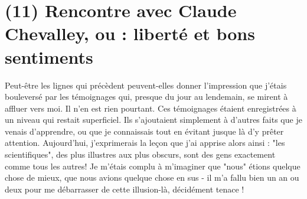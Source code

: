 \section{(11) Rencontre avec Claude Chevalley, ou : liberté et bons sentiments}

Peut-être les lignes qui précèdent peuvent-elles donner l'impression que j'étais bouleversé par les témoignages qui, presque du jour au lendemain, se mirent à affluer vers moi. Il n'en est rien pourtant. Ces témoignages étaient enregistrées à un niveau qui restait superficiel. Ils s'ajoutaient simplement à d'autres faits que je venais d'apprendre, ou que je connaissais tout en évitant jusque là d'y prêter attention. Aujourd'hui, j'exprimerais la leçon que j'ai apprise alors ainsi : "les scientifiques", des plus illustres aux plus obscurs, sont des gens exactement comme tous les autres! Je m'étais complu à m'imaginer que "nous" étions quelque chose de mieux, que nous avions quelque chose en sus - il m'a fallu bien un an ou deux pour me débarrasser de cette illusion-là, décidément tenace !

